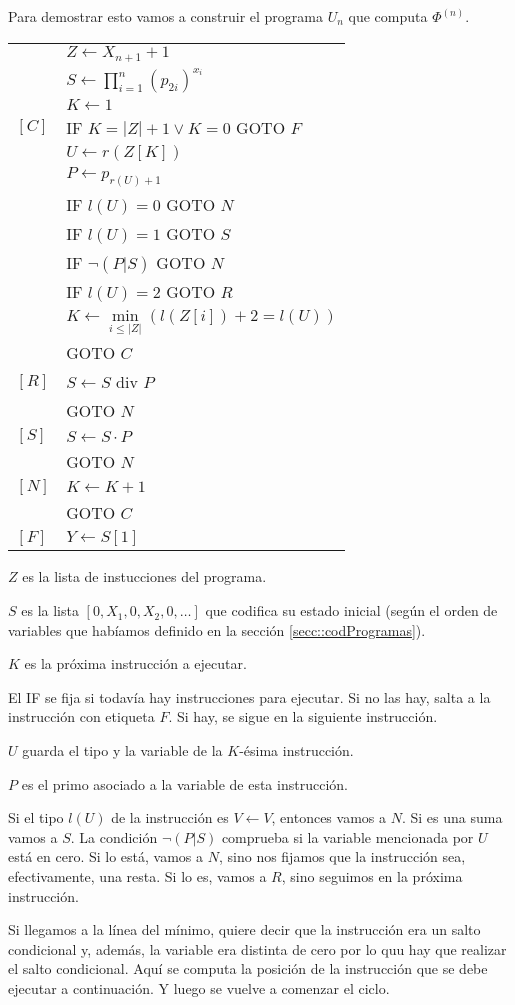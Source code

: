 \begin{demo}
	Para demostrar esto vamos a construir el programa $U_n$ que computa $\Phi^{(n)}$.
	\begin{multicols}{2}
			\begin{tabular}{ll}
				&$Z\leftarrow X_{n+1} +1$ \\
				&$S \leftarrow \prod\limits_{i=1}^{n} (p_{2i})^{x_i}$ \\
				&$K \leftarrow 1$\\
				$[C]$ & IF $K = |Z| + 1 \lor K = 0$ GOTO $F$ \\
				&$U \leftarrow r(Z[K])$ \\
				&$P \leftarrow p_{r(U)+1}$\\
				& IF $l(U) = 0$ GOTO $N$ \\
				& IF $l(U) = 1$ GOTO $S$ \\
				& IF $\lnot (P | S)$ GOTO $N$ \\
				& IF $l(U) = 2$ GOTO $R$ \\
				&$K \leftarrow \min\limits_{i\leq |Z|}(l(Z[i]) + 2 = l(U))$\\
				& GOTO $C$ \\
				$[R]$ & $S \leftarrow S$ div $P$ \\
				& GOTO $N$ \\
				$[S]$ & $S \leftarrow S\cdot P$ \\
				& GOTO $N$ \\
				$[N]$ & $K\leftarrow K + 1$ \\
				& GOTO $C$ \\
				$[F]$ & $Y \leftarrow S[1]$ \\
			\end{tabular}
		\vfill\null
	\columnbreak
	$Z$ es la lista de instucciones del programa.
	
	$S$ es la lista $[0,X_1,0,X_2,0,\dots]$ que codifica su estado inicial (según el orden de variables que habíamos definido en la sección \ref{secc::codProgramas}).
	
	$K$ es la próxima instrucción a ejecutar. 

	El IF se fija si todavía hay instrucciones para ejecutar. Si no las hay, salta a la instrucción con etiqueta $F$. Si hay, se sigue en la siguiente instrucción.
	
	$U$ guarda el tipo y la variable de la $K$-ésima instrucción.
	
	$P$ es el primo asociado a la variable de esta instrucción.
	
	Si el tipo $l(U)$ de la instrucción es $V\leftarrow V$, entonces vamos a $N$. Si es una suma vamos a $S$. La condición $\lnot(P|S)$ comprueba si la variable mencionada por $U$ está en cero. Si lo está, vamos a $N$, sino nos fijamos que la instrucción sea, efectivamente, una resta. Si lo es, vamos a $R$, sino seguimos en la próxima instrucción.
	\end{multicols}
Si llegamos a la línea del mínimo, quiere decir que la instrucción era un salto condicional y, además, la variable era distinta de cero por lo quu hay que realizar el salto condicional. Aquí se computa la posición de la instrucción que se debe ejecutar a continuación. Y luego se vuelve a comenzar el ciclo.


\end{demo}
